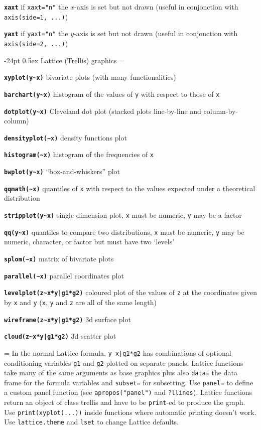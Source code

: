 \documentclass[10pt,landscape]{article}
\makeatletter
\renewcommand\section{\@startsection{section}{1}{0mm}%
                                     {-24pt}%
                                     {0.5ex}%
                                {\color{blue}\normalfont\large\bfseries}}
\newcommand{\code}{\texttt}
\newcommand{\bcode}[1]{\texttt{\textbf{#1}}}
\makeatother
\begin{document}
\begin{multicols*}{3}
\bcode{xaxt}  if \code{xaxt="n"} the $x$-axis is set but not drawn (useful in conjonction with \code{axis(side=1, ...)})

\bcode{yaxt}  if \code{yaxt="n"} the $y$-axis is set but not drawn (useful in conjonction with \code{axis(side=2, ...)})

\section{Lattice (Trellis) graphics}
\everypar={\hangindent=9mm}

\bcode{xyplot(y\~{}x)}  bivariate plots (with many functionalities)

\bcode{barchart(y\~{}x)}  histogram of the values of \code{y} with
respect to those of \code{x}

\bcode{dotplot(y\~{}x)}  Cleveland dot plot (stacked plots line-by-line
and column-by-column)

\bcode{densityplot(\~{}x)}  density functions plot

\bcode{histogram(\~{}x)}  histogram of the frequencies of \code{x}

\bcode{bwplot(y\~{}x)}  ``box-and-whiskers'' plot

\bcode{qqmath(\~{}x)}  quantiles of \code{x} with respect to the values expected under a theoretical distribution

\bcode{stripplot(y\~{}x)}  single dimension plot, \code{x} must be numeric, \code{y} may be a factor

\bcode{qq(y\~{}x)}  quantiles to compare two distributions, \code{x} must be numeric, \code{y} may be numeric, character, or factor but must have two `levels'

\bcode{splom(\~{}x)}  matrix of bivariate plots

\bcode{parallel(\~{}x)}  parallel coordinates plot

\bcode{levelplot(z\~{}x*y|g1*g2)}  coloured plot of the values of \code{z} at the coordinates given by \code{x} and \code{y} (\code{x}, \code{y} and \code{z} are all of the same length)

\bcode{wireframe(z\~{}x*y|g1*g2)}  3d surface plot

\bcode{cloud(z\~{}x*y|g1*g2)}  3d scatter plot

\everypar={\hangindent=0mm}
In the normal Lattice formula, \code{y~x|g1*g2} has
combinations of optional conditioning variables \code{g1}
and \code{g2} plotted on separate panels. Lattice functions
take many of the same arguments as base
graphics plus also \code{data=} the data frame for the formula
variables and \code{subset=} for subsetting. Use \code{panel=} to
define a custom panel function (see \code{apropos("panel")}
and \code{?llines}). Lattice functions return an object of class
trellis and have to be \code{print}-ed to produce the graph. Use
\code{print(xyplot(...))} inside functions where automatic
printing doesn't work. Use \code{lattice.theme} and \code{lset} to
change Lattice defaults.

\end{multicols*}
\end{document}
